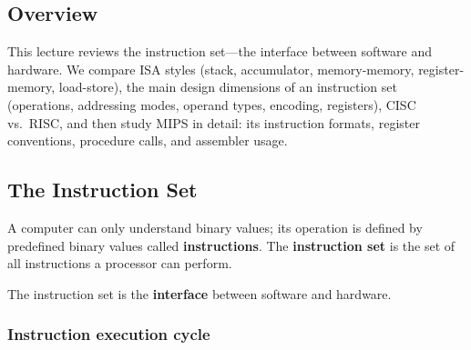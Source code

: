
\subsection{Overview}

This lecture reviews the instruction set---the interface between software and
hardware. We compare ISA styles (stack, accumulator, memory-memory,
register-memory, load-store), the main design dimensions of an instruction set
(operations, addressing modes, operand types, encoding, registers), CISC vs.\
RISC, and then study MIPS in detail: its instruction formats, register
conventions, procedure calls, and assembler usage.

\subsection{The Instruction Set}

\begin{definition}
A computer can only understand binary values; its operation is defined by
predefined binary values called \textbf{instructions}. The
\textbf{instruction set} is the set of all instructions a processor can
perform.
\end{definition}

\begin{center}
\end{center}
\begin{note}
The instruction set is the \textbf{interface} between software and hardware.
\end{note}

\subsubsection{Instruction execution cycle}

